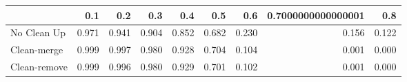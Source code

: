 \begin{tabular}{lrrrrrrrr}
\toprule
{} &   0.1 &   0.2 &   0.3 &   0.4 &   0.5 &   0.6 & 0.7000000000000001 &   0.8 \\
\midrule
No Clean Up  & 0.971 & 0.941 & 0.904 & 0.852 & 0.682 & 0.230 &              0.156 & 0.122 \\
Clean-merge  & 0.999 & 0.997 & 0.980 & 0.928 & 0.704 & 0.104 &              0.001 & 0.000 \\
Clean-remove & 0.999 & 0.996 & 0.980 & 0.929 & 0.701 & 0.102 &              0.001 & 0.000 \\
\bottomrule
\end{tabular}
